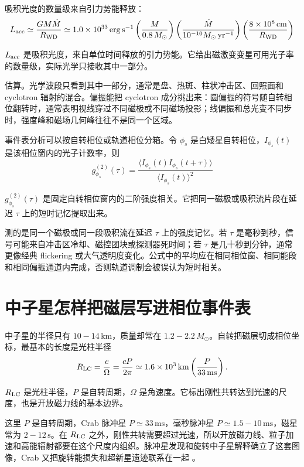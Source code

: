 吸积光度的数量级来自引力势能释放：
\begin{equation}
  L_{\rm acc}\simeq \frac{GM\dot M}{R_{\rm WD}}
  \simeq 1.0\times10^{33}\,\mathrm{erg\,s^{-1}}
  \left(\frac{M}{0.8\,M_\odot}\right)
  \left(\frac{\dot M}{10^{-10}M_\odot\,{\rm yr^{-1}}}\right)
  \left(\frac{8\times10^8\,{\rm cm}}{R_{\rm WD}}\right)
  \label{eq:ch11-10}
\end{equation}
\begin{formulaexplain}
\(L_{\rm acc}\) 是吸积光度，来自单位时间释放的引力势能。它给出磁激变变星可用光子率的数量级，实际光学只接收其中一部分。
\end{formulaexplain}
估算。光学波段只看到其中一部分，通常是盘、热斑、柱状冲击区、回照面和 cyclotron 辐射的混合。偏振能把 cyclotron 成分挑出来：圆偏振的符号随自转相位翻转时，通常表明视线穿过不同磁极或不同磁场投影；线偏振和总光变不同步时，强度峰和磁场几何峰往往不是同一个区域。

事件表分析可以按自转相位或轨道相位分箱。令 \(\phi_s\) 是白矮星自转相位，\(I_{\phi_s}(t)\) 是该相位窗内的光子计数率，则
\begin{equation}
  g^{(2)}_{\phi_s}(\tau)=
  \frac{\langle I_{\phi_s}(t)I_{\phi_s}(t+\tau)\rangle}
  {\langle I_{\phi_s}(t)\rangle^2}
  \label{eq:ch11-11}
\end{equation}
\begin{formulaexplain}
\(g^{(2)}_{\phi_s}(\tau)\) 是固定自转相位窗内的二阶强度相关。它把同一磁极或吸积流片段在延迟 \(\tau\) 上的短时记忆提取出来。
\end{formulaexplain}
测的是同一个磁极或同一段吸积流在延迟 \(\tau\) 上的强度记忆。若 \(\tau\) 是毫秒到秒，信号可能来自冲击区冷却、磁控团块或探测器死时间；若 \(\tau\) 是几十秒到分钟，通常更像经典 flickering 或大气透明度变化。公式中的平均应在相同相位窗、相同能段和相同偏振通道内完成，否则轨道调制会被误认为短时相关。

\section{中子星怎样把磁层写进相位事件表}

中子星的半径只有 \(10-14\,\mathrm{km}\)，质量却常在 \(1.2-2.2\,M_\odot\)。自转把磁层切成相位坐标，最基本的长度是光柱半径
\begin{equation}
  R_{\rm LC}=\frac{c}{\Omega}=\frac{cP}{2\pi}
  \simeq 1.6\times10^3\,\mathrm{km}
  \left(\frac{P}{33\,{\rm ms}}\right).
  \label{eq:ch11-12}
\end{equation}
\begin{formulaexplain}
\(R_{\rm LC}\) 是光柱半径，\(P\) 是自转周期，\(\Omega\) 是角速度。它标出刚性共转达到光速的尺度，也是开放磁力线的基本边界。
\end{formulaexplain}
这里 \(P\) 是自转周期，Crab 脉冲星 \(P\simeq33\,\mathrm{ms}\)，毫秒脉冲星 \(P\simeq1.5-10\,\mathrm{ms}\)，磁星常为 \(2-12\,\mathrm{s}\)。在 \(R_{\rm LC}\) 之外，刚性共转需要超过光速，所以开放磁力线、粒子加速和高能辐射都要在这个尺度内组织。脉冲星发现和旋转中子星解释确立了这套图像，Crab 又把旋转能损失和超新星遗迹联系在一起 \citep{1968Natur.217..709H,1968Natur.218..731G,1968Natur.219..145P,1972ApJ...175..217B}。

